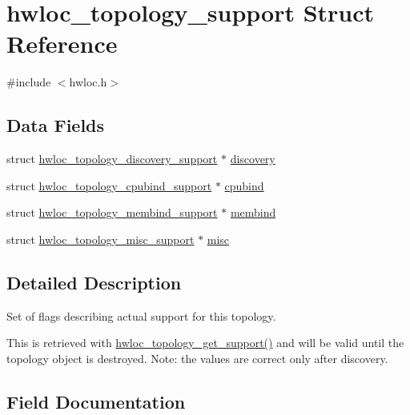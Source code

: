 \hypertarget{a00306}{}\section{hwloc\+\_\+topology\+\_\+support Struct Reference}
\label{a00306}


{\ttfamily \#include $<$hwloc.\+h$>$}

\subsection*{Data Fields}
\begin{DoxyCompactItemize}
\item 
struct \hyperlink{a00290}{hwloc\+\_\+topology\+\_\+discovery\+\_\+support} $\ast$ \hyperlink{a00306_aea3fbd7653d987d81f848636c420504d}{discovery}
\item 
struct \hyperlink{a00294}{hwloc\+\_\+topology\+\_\+cpubind\+\_\+support} $\ast$ \hyperlink{a00306_adef2bb91f74c3e70a2a071393caf5f56}{cpubind}
\item 
struct \hyperlink{a00298}{hwloc\+\_\+topology\+\_\+membind\+\_\+support} $\ast$ \hyperlink{a00306_ac6eb62ae8bc0a68dce679a7107a36194}{membind}
\item 
struct \hyperlink{a00302}{hwloc\+\_\+topology\+\_\+misc\+\_\+support} $\ast$ \hyperlink{a00306_ab9d08df4b0b03994f21b893ece826e78}{misc}
\end{DoxyCompactItemize}


\subsection{Detailed Description}
Set of flags describing actual support for this topology. 

This is retrieved with \hyperlink{a00193_gab8c76173c4a8ce1a9a9366012b1388e6}{hwloc\+\_\+topology\+\_\+get\+\_\+support()} and will be valid until the topology object is destroyed. Note\+: the values are correct only after discovery. 

\subsection{Field Documentation}
\mbox{\label{a00306_adef2bb91f74c3e70a2a071393caf5f56}} 
